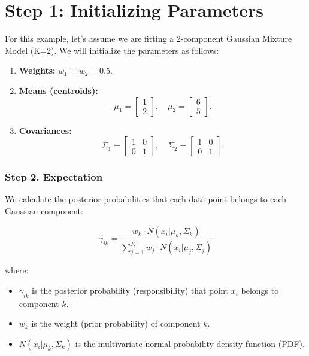 \documentclass{article}
\begin{document}
\section*{Step 1: Initializing Parameters}

For this example, let's assume we are fitting a 2-component Gaussian Mixture Model (K=2). We will initialize the parameters as follows:

\begin{enumerate}
    \item \textbf{Weights:} \( w_1 = w_2 = 0.5 \).
    \item \textbf{Means (centroids):} 
    \[
    \mu_1 =
    \begin{bmatrix}
        1 \\
        2
    \end{bmatrix}, \quad
    \mu_2 =
    \begin{bmatrix}
        6 \\
        5
    \end{bmatrix}.
    \]
    \item \textbf{Covariances:} 
    \[
    \Sigma_1 =
    \begin{bmatrix}
        1 & 0 \\
        0 & 1
    \end{bmatrix}, \quad
    \Sigma_2 =
    \begin{bmatrix}
        1 & 0 \\
        0 & 1
    \end{bmatrix}.
    \]
\end{enumerate}
\subsubsection*{Step 2. Expectation}
We calculate the posterior probabilities that each data point belongs to each Gaussian component:

\[
\gamma_{ik} = \frac{w_k \cdot N(x_i \vert \mu_k , \Sigma_k)}{\sum_{j=1}^{K} w_j \cdot N(x_i \vert \mu_j, \Sigma_j)}
\]

where:
\begin{itemize}
    \item \( \gamma_{ik} \) is the posterior probability (responsibility) that point \( x_i \) belongs to component \( k \).
    \item \( w_k \) is the weight (prior probability) of component \( k \).
    \item \( N(x_i \vert \mu_k , \Sigma_k) \) is the multivariate normal probability density function (PDF).
\end{itemize}
\end{document}
